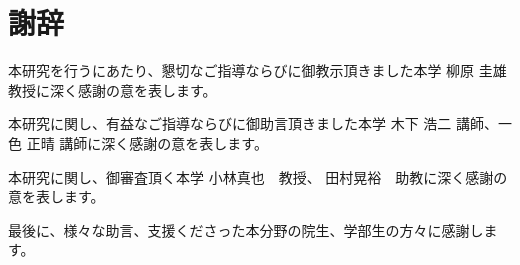 \chapter*{謝辞}
本研究を行うにあたり、懇切なご指導ならびに御教示頂きました本学 柳原 圭雄 教授に深く感謝の意を表します。\par
本研究に関し、有益なご指導ならびに御助言頂きました本学 木下 浩二 講師、一色 正晴 講師に深く感謝の意を表します。\par
本研究に関し、御審査頂く本学 小林真也　教授、 田村晃裕　助教に深く感謝の意を表します。　\par
最後に、様々な助言、支援くださった本分野の院生、学部生の方々に感謝します。

